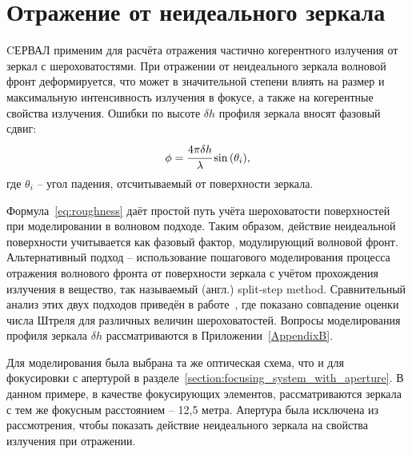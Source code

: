\section{Отражение от неидеального зеркала}\label{section:roughness}
CЕРВАЛ применим для расчёта отражения частично когерентного излучения от зеркал с шероховатостями. При отражении от неидеального зеркала волновой фронт деформируется, что может в значительной степени влиять на размер и максимальную интенсивность излучения в фокусе, а также на когерентные свойства излучения. Ошибки по высоте $\delta h$ профиля зеркала вносят фазовый сдвиг: 
\begin{align}
	\phi = \cfrac{4 \pi \delta h}{\lambda} \sin{(\theta_i)},
	\label{eq:roughness}
\end{align}
где $\theta_i$ -- угол падения, отсчитываемый от поверхности зеркала. 

Формула~\ref{eq:roughness} даёт простой путь учёта шероховатости поверхностей при моделировании в волновом подходе. Таким образом, действие неидеальной поверхности учитывается как фазовый фактор, модулирующий волновой фронт. Альтернативный подход -- использование пошагового моделирования процесса отражения волнового фронта от поверхности зеркала с учётом прохождения излучения в вещество, так называемый (англ.) split-step method. Сравнительный анализ этих двух подходов приведён в работе~\cite{serkez_design_2015}, где показано совпадение оценки числа Штреля для различных величин шероховатостей. Вопросы моделирования профиля зеркала $\delta h$ рассматриваются в Приложении~\ref{AppendixB}.

Для моделирования была выбрана та же оптическая схема, что и для фокусировки с апертурой в разделе~\ref{section:focusing_system_with_aperture}. В данном примере, в качестве фокусирующих элементов, рассматриваются зеркала с тем же фокусным расстоянием -- 12,5 метра. Апертура была исключена из рассмотрения, чтобы показать действие неидеального зеркала на свойства излучения при отражении. 

